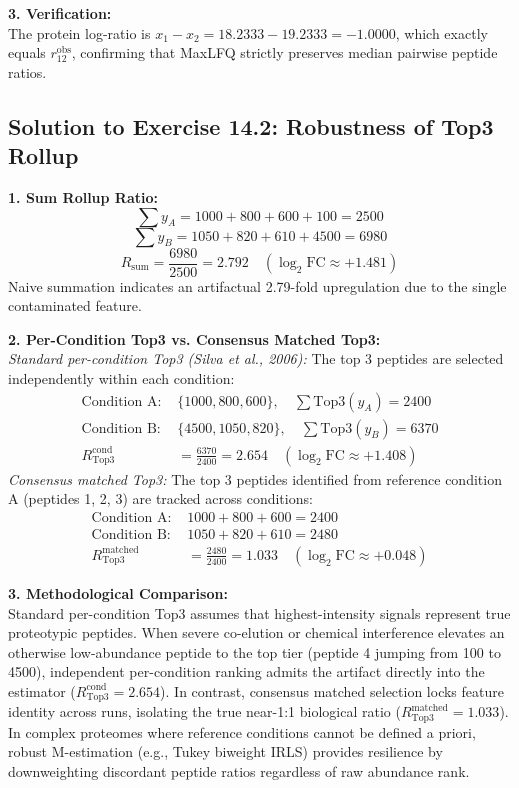 \documentclass[11pt,oneside]{book}
\begin{document}
\textbf{3. Verification:}\\
The protein log-ratio is $x_1 - x_2 = 18.2333 - 19.2333 = -1.0000$, which exactly equals $r_{12}^{\text{obs}}$, confirming that MaxLFQ strictly preserves median pairwise peptide ratios.

\subsection*{Solution to Exercise 14.2: Robustness of Top3 Rollup}
\textbf{1. Sum Rollup Ratio:}\\
$$\sum y_A = 1000 + 800 + 600 + 100 = 2500$$
$$\sum y_B = 1050 + 820 + 610 + 4500 = 6980$$
$$R_{\text{sum}} = \frac{6980}{2500} = 2.792 \quad (\log_2\text{FC} \approx +1.481)$$
Naive summation indicates an artifactual 2.79-fold upregulation due to the single contaminated feature.

\textbf{2. Per-Condition Top3 vs. Consensus Matched Top3:}\\
\textit{Standard per-condition Top3 (Silva et al., 2006):} The top 3 peptides are selected independently within each condition:
\begin{align*}
\text{Condition A: } & \{1000, 800, 600\}, \quad \sum \text{Top3}(y_A) = 2400 \\
\text{Condition B: } & \{4500, 1050, 820\}, \quad \sum \text{Top3}(y_B) = 6370 \\
R_{\text{Top3}}^{\text{cond}} &= \frac{6370}{2400} = 2.654 \quad (\log_2\text{FC} \approx +1.408)
\end{align*}
\textit{Consensus matched Top3:} The top 3 peptides identified from reference condition A (peptides 1, 2, 3) are tracked across conditions:
\begin{align*}
\text{Condition A: } & 1000 + 800 + 600 = 2400 \\
\text{Condition B: } & 1050 + 820 + 610 = 2480 \\
R_{\text{Top3}}^{\text{matched}} &= \frac{2480}{2400} = 1.033 \quad (\log_2\text{FC} \approx +0.048)
\end{align*}

\textbf{3. Methodological Comparison:}\\
Standard per-condition Top3 assumes that highest-intensity signals represent true proteotypic peptides. When severe co-elution or chemical interference elevates an otherwise low-abundance peptide to the top tier (peptide 4 jumping from 100 to 4500), independent per-condition ranking admits the artifact directly into the estimator ($R_{\text{Top3}}^{\text{cond}} = 2.654$). In contrast, consensus matched selection locks feature identity across runs, isolating the true near-1:1 biological ratio ($R_{\text{Top3}}^{\text{matched}} = 1.033$). In complex proteomes where reference conditions cannot be defined a priori, robust M-estimation (e.g., Tukey biweight IRLS) provides resilience by downweighting discordant peptide ratios regardless of raw abundance rank.
\end{document}
